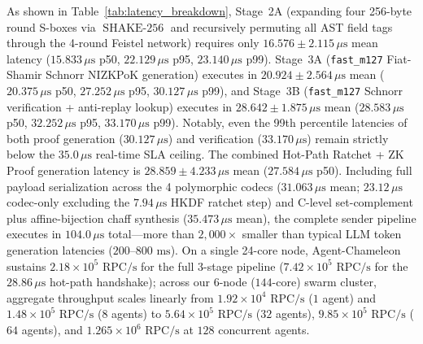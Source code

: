 \documentclass[conference,10pt]{IEEEtran}
\begin{document}
As shown in Table~\ref{tab:latency_breakdown}, Stage~2A (expanding four 256-byte round S-boxes via $\operatorname{SHAKE-256}$ and recursively permuting all AST field tags through the 4-round Feistel network) requires only $16.576 \pm 2.115\,\mu\text{s}$ mean latency ($15.833\,\mu\text{s}$ p50, $22.129\,\mu\text{s}$ p95, $23.140\,\mu\text{s}$ p99). Stage~3A (\texttt{fast\_m127} Fiat-Shamir Schnorr NIZKPoK generation) executes in $20.924 \pm 2.564\,\mu\text{s}$ mean ($20.375\,\mu\text{s}$ p50, $27.252\,\mu\text{s}$ p95, $30.127\,\mu\text{s}$ p99), and Stage~3B (\texttt{fast\_m127} Schnorr verification + anti-replay lookup) executes in $28.642 \pm 1.875\,\mu\text{s}$ mean ($28.583\,\mu\text{s}$ p50, $32.252\,\mu\text{s}$ p95, $33.170\,\mu\text{s}$ p99). Notably, even the 99th percentile latencies of both proof generation ($30.127\,\mu\text{s}$) and verification ($33.170\,\mu\text{s}$) remain strictly below the $35.0\,\mu\text{s}$ real-time SLA ceiling. The combined Hot-Path Ratchet + ZK Proof generation latency is $28.859 \pm 4.233\,\mu\text{s}$ mean ($27.584\,\mu\text{s}$ p50). Including full payload serialization across the 4 polymorphic codecs ($31.063\,\mu\text{s}$ mean; $23.12\,\mu\text{s}$ codec-only excluding the $7.94\,\mu\text{s}$ HKDF ratchet step) and C-level set-complement plus affine-bijection chaff synthesis ($35.473\,\mu\text{s}$ mean), the complete sender pipeline executes in $104.0\,\mu\text{s}$ total---more than $2{,}000\times$ smaller than typical LLM token generation latencies ($200$--$800\text{ ms}$). On a single 24-core node, Agent-Chameleon sustains $2.18 \times 10^5\text{ RPC/s}$ for the full 3-stage pipeline ($7.42 \times 10^5\text{ RPC/s}$ for the $28.86\,\mu\text{s}$ hot-path handshake); across our 6-node ($144$-core) swarm cluster, aggregate throughput scales linearly from $1.92 \times 10^4\text{ RPC/s}$ ($1$ agent) and $1.48 \times 10^5\text{ RPC/s}$ ($8$ agents) to $5.64 \times 10^5\text{ RPC/s}$ ($32$ agents), $9.85 \times 10^5\text{ RPC/s}$ ($64$ agents), and $1.265 \times 10^6\text{ RPC/s}$ at $128$ concurrent agents.
\end{document}
